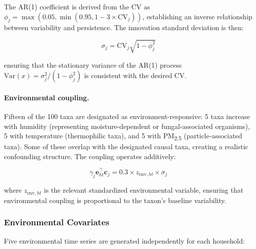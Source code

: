 \documentclass[11pt,letterpaper]{article}
\begin{document}
The AR(1) coefficient is derived from the CV as $\phi_j = \max(0.05, \min(0.95, 1 - 3 \times \text{CV}_j))$, establishing an inverse relationship between variability and persistence. The innovation standard deviation is then:

\begin{equation}
    \sigma_j = \text{CV}_j \sqrt{1 - \phi_j^2}
\end{equation}

\noindent ensuring that the stationary variance of the AR(1) process $\text{Var}(x) = \sigma_j^2 / (1 - \phi_j^2)$ is consistent with the desired CV.

\paragraph{Environmental coupling.} Fifteen of the 100 taxa are designated as environment-responsive: 5 taxa increase with humidity (representing moisture-dependent or fungal-associated organisms), 5 with temperature (thermophilic taxa), and 5 with PM\textsubscript{2.5} (particle-associated taxa). Some of these overlap with the designated causal taxa, creating a realistic confounding structure. The coupling operates additively:

\begin{equation}
    \gamma_j \mathbf{e}_{ht}^\top \mathbf{c}_j = 0.3 \times z_{\text{env},ht} \times \sigma_j
\end{equation}

\noindent where $z_{\text{env},ht}$ is the relevant standardized environmental variable, ensuring that environmental coupling is proportional to the taxon's baseline variability.

\subsubsection{Environmental Covariates}

Five environmental time series are generated independently for each household:
\end{document}
